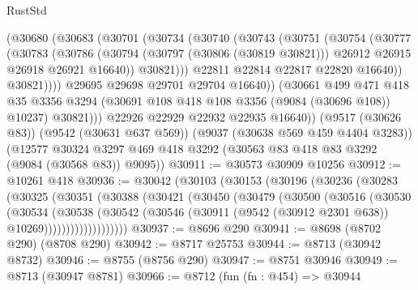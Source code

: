 \begin{lexlean}{RustStd}
\begin{coremodule}
              (@30680
                (@30683
                  (@30701
                    (@30734
                      (@30740
                        (@30743
                          (@30751
                            (@30754
                              (@30777
                                (@30783
                                  (@30786
                                    (@30794
                                      (@30797 (@30806 (@30819 @30821)))
                                      @26912
                                      @26915
                                      @26918
                                      @26921
                                      @16640))
                                  @30821)))
                            @22811
                            @22814
                            @22817
                            @22820
                            @16640))
                        @30821))))
                @29695
                @29698
                @29701
                @29704
                @16640))
            (@30661
              @499
              @471
              @418
              @35
              @3356
              @3294
              (@30691 @108 @418 @108 @3356 (@9084 (@30696 @108)) @10237)
              @30821)))
        @22926
        @22929
        @22932
        @22935
        @16640))
    (@9517 (@30626 @83))
    (@9542 (@30631 @637 @569))
    (@9037 (@30638 @569 @459 @4404 @3283))
    (@12577 @30324 @3297 @469 @418 @3292 (@30563 @83 @418 @83 @3292 (@9084 (@30568 @83)) @9095))
@30911 := @30573 @30909 @10256
@30912 := @10261 @418
@30936 := @30042
    (@30103
      (@30153
        (@30196
          (@30236
            (@30283
              (@30325
                (@30351
                  (@30388
                    (@30421
                      (@30450
                        (@30479
                          (@30500
                            (@30516
                              (@30530
                                (@30534
                                  (@30538
                                    (@30542
                                      (@30546
                                        (@30911
                                          (@9542 (@30912 @2301 @638))
                                          @10269)))))))))))))))))))
@30937 := @8696 @290
@30941 := @8698 (@8702 @290) (@8708 @290)
@30942 := @8717 @25753
@30944 := @8713 (@30942 @8732)
@30946 := @8755 (@8756 @290)
@30947 := @8751 @30946
@30949 := @8713 (@30947 @8781)
@30966 := @8712
    (fun (fn : @454) =>
    @30944

\end{coremodule}
\end{lexlean}
